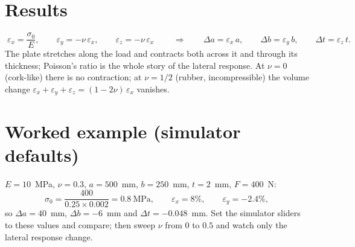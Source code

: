 \documentclass[10pt,a4paper]{article}
\begin{document}
\section*{Results}
\begin{equation}
\boxed{\;
\varepsilon_x = \frac{\sigma_0}{E}, \qquad
\varepsilon_y = -\nu\,\varepsilon_x, \qquad
\varepsilon_z = -\nu\,\varepsilon_x
\;}
\qquad\Rightarrow\qquad
\Delta a = \varepsilon_x\, a, \qquad
\Delta b = \varepsilon_y\, b, \qquad
\Delta t = \varepsilon_z\, t .
\end{equation}
The plate stretches along the load and contracts both across it and through its
thickness; Poisson's ratio is the whole story of the lateral response. At
$\nu = 0$ (cork-like) there is no contraction; at $\nu = 1/2$ (rubber,
incompressible) the volume change
$\varepsilon_x + \varepsilon_y + \varepsilon_z = (1 - 2\nu)\,\varepsilon_x$
vanishes.

\section*{Worked example (simulator defaults)}
$E = 10$~MPa, $\nu = 0.3$, $a = 500$~mm, $b = 250$~mm, $t = 2$~mm, $F = 400$~N:
\begin{equation}
\sigma_0 = \frac{400}{0.25 \times 0.002} = 0.8~\text{MPa}, \qquad
\varepsilon_x = 8\%, \qquad \varepsilon_y = -2.4\%,
\end{equation}
so $\Delta a = 40$~mm, $\Delta b = -6$~mm and $\Delta t = -0.048$~mm. Set the
simulator sliders to these values and compare; then sweep $\nu$ from $0$ to
$0.5$ and watch only the lateral response change.
\end{document}
